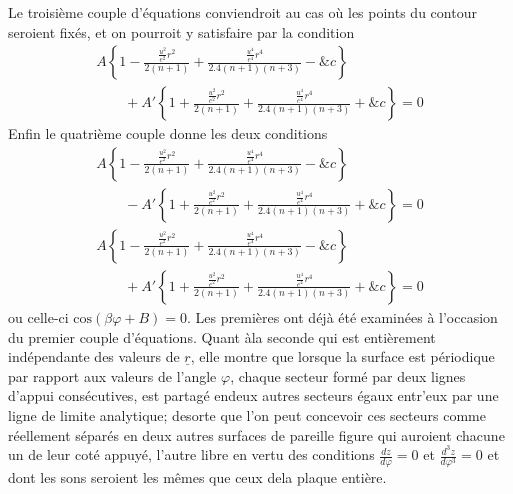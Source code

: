 \documentclass[11pt,a4paper]{article}
\begin{document}
Le troisième couple d'équations conviendroit au cas où les points
du contour seroient fixés, et on pourroit y satisfaire par la
condition
\[ \begin{array}{l} A\left\{1 - \frac{\frac{u^2}{e^2}r^2}{2(n+1)} + \frac{\frac{u^4}{e^4}r^4}{2.4(n+1)(n+3)} - \&c\right\} \\ \qquad + A'\left\{1 + \frac{\frac{u^2}{e^2}r^2}{2(n+1)} + \frac{\frac{u^4}{e^4}r^4}{2.4(n+1)(n+3)} + \&c\right\} = 0 \end{array} \]
Enfin le quatrième couple donne les deux conditions
\[ \begin{array}{l} A\left\{1 - \frac{\frac{u^2}{e^2}r^2}{2(n+1)} + \frac{\frac{u^4}{e^4}r^4}{2.4(n+1)(n+3)} - \&c\right\} \\ \qquad - A'\left\{1 + \frac{\frac{u^2}{e^2}r^2}{2(n+1)} + \frac{\frac{u^4}{e^4}r^4}{2.4(n+1)(n+3)} + \&c\right\} = 0 \end{array} \]
\[ \begin{array}{l} A\left\{1 - \frac{\frac{u^2}{e^2}r^2}{2(n+1)} + \frac{\frac{u^4}{e^4}r^4}{2.4(n+1)(n+3)} - \&c\right\} \\ \qquad + A'\left\{1 + \frac{\frac{u^2}{e^2}r^2}{2(n+1)} + \frac{\frac{u^4}{e^4}r^4}{2.4(n+1)(n+3)} + \&c\right\} = 0 \end{array} \]
ou celle-ci $\text{cos}(\beta\varphi + B) = 0$. Les premières ont déjà
été examinées à l'occasion du premier couple d'équations.
Quant àla seconde qui est entièrement indépendante
des valeurs de $\underline{r}$, elle montre que lorsque la surface
est périodique par rapport aux valeurs de l'angle
$\varphi$, chaque secteur formé par deux lignes d'appui
consécutives, est partagé endeux autres secteurs égaux
entr'eux par une ligne de limite analytique;
desorte que l'on peut concevoir ces secteurs
comme réellement séparés  en deux autres
 surfaces de pareille figure
qui auroient chacune un de leur coté appuyé,
l'autre libre en vertu des conditions $\frac{dz}{d\varphi} = 0$ et
$\frac{d^3z}{d\varphi^3} = 0$ et  dont les sons seroient
les mêmes que ceux dela plaque entière.

\end{document}
